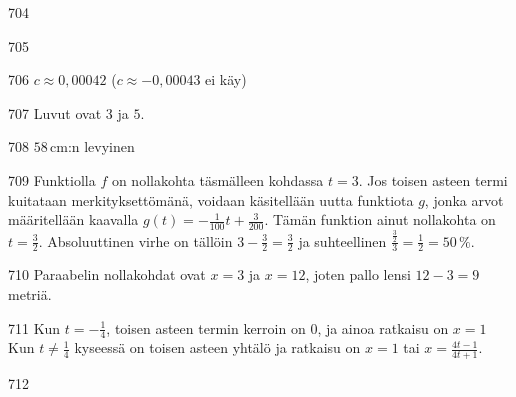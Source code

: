 \begin{Vastaus}{704}
    
\end{Vastaus}
\begin{Vastaus}{705}
    
\end{Vastaus}
\begin{Vastaus}{706}
	$c\approx 0,00042$ ($c \approx -0,00043$ ei käy)
	
\end{Vastaus}
\begin{Vastaus}{707}
		Luvut ovat $3$ ja $5$.
    
\end{Vastaus}
\begin{Vastaus}{708}
		$58$\,cm:n levyinen
    
\end{Vastaus}
\begin{Vastaus}{709}
Funktiolla $f$ on nollakohta täsmälleen kohdassa $t=3$. Jos toisen asteen termi kuitataan merkityksettömänä, voidaan käsitellään uutta funktiota $g$, jonka arvot määritellään kaavalla $g(t)=-\frac{1}{100}t+\frac{3}{200}$. Tämän funktion ainut nollakohta on $t=\frac{3}{2}$. Absoluuttinen virhe on tällöin $3-\frac{3}{2}=\frac{3}{2}$ ja suhteellinen $\frac{\frac{3}{2}}{3}=\frac{1}{2}=50\,\%$.
    
\end{Vastaus}
\begin{Vastaus}{710}
		Paraabelin nollakohdat ovat $x=3$ ja $x=12$, joten pallo lensi $12-3 = 9$ metriä.
	
\end{Vastaus}
\begin{Vastaus}{711}
		Kun $t=-\frac{1}{4}$, toisen asteen termin kerroin on $0$, ja ainoa ratkaisu on $x = 1$  \\
		Kun $t \neq \frac{1}{4}$ kyseessä on toisen asteen yhtälö ja ratkaisu on $x= 1$ tai $x=\frac{4t-1}{4t+1}$.
    
\end{Vastaus}
\begin{Vastaus}{712}
	
\end{Vastaus}

